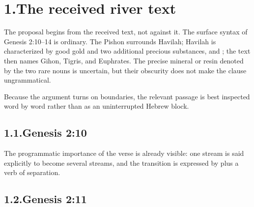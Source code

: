 \section*{1.\quad The received river text}

The proposal begins from the received text, not against it.  The surface syntax of Genesis 2:10--14 is ordinary.  The Pishon surrounds Havilah; Havilah is characterized by good gold and two additional precious substances,  and ; the text then names Gihon, Tigris, and Euphrates.  The precise mineral or resin denoted by the two rare nouns is uncertain, but their obscurity does not make the clause ungrammatical.\cite{BDB,Westermann1984}

Because the argument turns on boundaries, the relevant passage is best inspected word by word rather than as an uninterrupted Hebrew block.

\subsection*{1.1.\quad Genesis 2:10}


The programmatic importance of the verse is already visible: one stream is said explicitly to become several streams, and the transition is expressed by  plus a verb of separation.

\subsection*{1.2.\quad Genesis 2:11}

